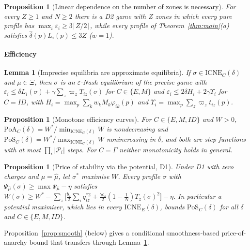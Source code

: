\documentclass[preprint,12pt]{elsarticle}
\newtheorem{lemma}[theorem]{Lemma}
\newtheorem{proposition}[theorem]{Proposition}
\theoremstyle{definition}
\theoremstyle{remark}
\newcommand{\cP}{\mathcal{P}}
\newcommand{\ICNE}{\mathrm{ICNE}}
\begin{document}
\begin{proposition}[Linear dependence on the number of zones is necessary]\label{prop:cycles}
For every $Z\ge1$ and $N\ge2$ there is a D2 game with $Z$ zones in which every pure profile has $\max_i\varepsilon_i\ge3\lceil Z/2\rceil$, while every profile of Theorem~\ref{thm:main}(a) satisfies $\hat\delta(p)L_i(p)\le3Z$ ($w=1$).
\end{proposition}

\paragraph{Efficiency}

\begin{lemma}[Imprecise equilibria are approximate equilibria]\label{lem:transfer}
If $\sigma\in\ICNE_C(\delta)$ and $\mu\in\Xi$, then $\sigma$ is an $\varepsilon$-Nash equilibrium of the precise game with $\varepsilon_i\le\delta L_i(\sigma)+\gamma\sum_z\varpi_zT_{iz}(\sigma)$ for $C\in\{E,M\}$ and $\varepsilon_i\le2\delta H_i+2\gamma\Upsilon_i$ for $C=ID$, with $H_i=\max_p\sum_kw_kM_k\varphi_{ik}(p)$ and $\Upsilon_i=\max_p\sum_z\varpi_zt_{iz}(p)$.
\end{lemma}

\begin{proposition}[Monotone efficiency curves]\label{prop:cs}
For $C\in\{E,M,ID\}$ and $W>0$, $\mathrm{PoA}_C(\delta)=W^*/\min_{\ICNE_C(\delta)}W$ is nondecreasing and $\mathrm{PoS}_C(\delta)=W^*/\max_{\ICNE_C(\delta)}W$ nonincreasing in $\delta$, and both are step functions with at most $\prod_i|\cP_i|$ steps. For $C=\Gamma$ neither monotonicity holds in general.
\end{proposition}

\begin{proposition}[Price of stability via the potential, D1]\label{prop:pos}
Under D1 with zero charges and $\mu=\hat\mu$, let $\sigma^*$ maximise $W$. Every profile $\sigma$ with $\Psi_{\hat\mu}(\sigma)\ge\max\Psi_{\hat\mu}-\eta$ satisfies
$W(\sigma)\ge W^*-\sum_z\big[\tfrac{b_z}{2}\sum_iq_{iz}^{*2}+\tfrac{\gamma c_z}{2}(1-\tfrac1N)T_z(\sigma)^2\big]-\eta$. In particular a potential maximiser, which lies in every $\ICNE_E(\delta)$, bounds $\mathrm{PoS}_C(\delta)$ for all $\delta$ and $C\in\{E,M,ID\}$.
\end{proposition}

Proposition~\ref{prop:smooth} (below) gives a conditional smoothness-based price-of-anarchy bound that transfers through Lemma~\ref{lem:transfer}.
\end{document}
